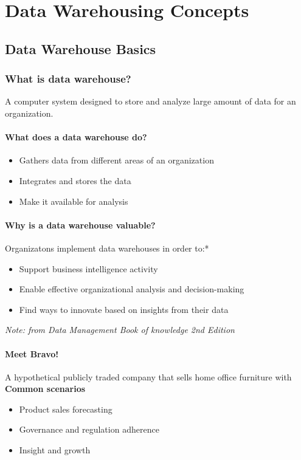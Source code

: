 \chapter{Data Warehousing Concepts}
\section{Data Warehouse Basics}
\subsection{What is data warehouse?}
A computer system designed to store and analyze large amount of data for an organization.

\subsubsection{What does a data warehouse do?}
\begin{itemize}
    \item Gathers data from different areas of an organization
    \item Integrates and stores the data
    \item Make it available for analysis
\end{itemize}

\subsubsection{Why is a data warehouse valuable?}
Organizatons implement data warehouses in order to:*
\begin{itemize}
    \item Support business intelligence activity
    \item Enable effective organizational analysis and decision-making
    \item Find ways to innovate based on insights from their data
\end{itemize}
\emph{Note: from Data Management Book of knowledge 2nd Edition}

\subsubsection{Meet Bravo!}
A hypothetical publicly traded company that sells home office furniture with
\textbf{Common scenarios}
\begin{itemize}
    \item Product sales forecasting
    \item Governance and regulation adherence
    \item Insight and growth
\end{itemize}

